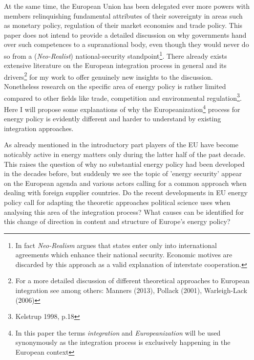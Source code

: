 \documentclass[11pt,a4paper,english]{scrreprt}
\begin{document}
At the same time, the European Union has been delegated ever more powers with
members relinquishing fundamental attributes of their sovereignty in areas
such as monetary policy, regulation of their market economies and trade policy.
This paper does not intend to provide a detailed discussion on why governments
hand over such competences to a supranational body, even though they would
never do so from a (\emph{Neo-Realist}) national-security
standpoint\footnote{\textcolor{dunkelgrau.80}{In fact \emph{Neo-Realism}
argues that states enter only into international agreements which enhance their
national security. Economic motives are discarded by this approach as a valid
explanation of interstate cooperation.}}. There already exists extensive
literature on the European integration process in general and its
drivers\footnote{For a more detailed discussion of different theoretical
approaches to European integration see among others: Manners (2013), Pollack
(2001), Warleigh-Lack (2006)} for my work to offer genuinely new insights to the
discussion. Nonetheless research on the specific area of energy policy is rather
limited compared to other fields like trade, competition and environmental
regulation\footnote{Kelstrup 1998, p.18}. Here I will propose some explanations
of why the Europeanization\footnote{\textcolor{dunkelgrau.80}{In this paper the
terms \emph{integration} and \emph{Europeanization} will be used synonymously as
the integration process is exclusively happening in the European context}}
process for energy policy is evidently different and harder to understand by
existing integration approaches.\par

As already mentioned in the introductory part players of the EU have become
noticably active in energy matters only during the latter half of the past
decade. This raises the question of why no substantial energy policy had been
developed in the decades before, but suddenly we see the topic of 'energy
security' appear on the European agenda and various actors calling for a common
approach when dealing with foreign supplier countries. Do the recent
developments in EU energy policy call for adapting the theoretic approaches
political science uses when analysing this area of the integration process?
What causes can be identified for this change of direction in content and
structure of Europe's energy policy?\par


 
\end{document}
